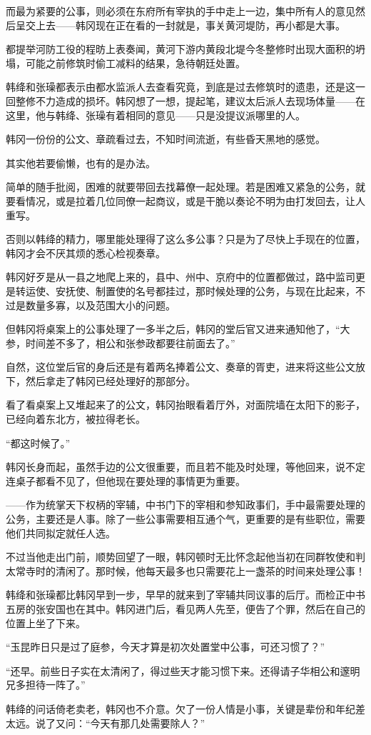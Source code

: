 而最为紧要的公事，则必须在东府所有宰执的手中走上一边，集中所有人的意见然后呈交上去——韩冈现在正在看的一封就是，事关黄河堤防，再小都是大事。

都提举河防工役的程昉上表奏闻，黄河下游内黄段北堤今冬整修时出现大面积的坍塌，可能之前修筑时偷工减料的结果，急待朝廷处置。

韩绛和张璪都表示由都水监派人去查看究竟，到底是过去修筑时的遗患，还是这一回整修不力造成的损坏。韩冈想了一想，提起笔，建议太后派人去现场体量——在这里，他与韩绛、张璪有着相同的意见——只是没提议派哪里的人。

韩冈一份份的公文、章疏看过去，不知时间流逝，有些昏天黑地的感觉。

其实他若要偷懒，也有的是办法。

简单的随手批阅，困难的就要带回去找幕僚一起处理。若是困难又紧急的公务，就要看情况，或是拉着几位同僚一起商议，或是干脆以奏论不明为由打发回去，让人重写。

否则以韩绛的精力，哪里能处理得了这么多公事？只是为了尽快上手现在的位置，韩冈才会不厌其烦的悉心检视奏章。

韩冈好歹是从一县之地爬上来的，县中、州中、京府中的位置都做过，路中监司更是转运使、安抚使、制置使的名号都挂过，那时候处理的公务，与现在比起来，不过是数量多寡，以及范围大小的问题。

但韩冈将桌案上的公事处理了一多半之后，韩冈的堂后官又进来通知他了，“大参，时间差不多了，相公和张参政都要往前面去了。”

自然，这位堂后官的身后还是有着两名捧着公文、奏章的胥吏，进来将这些公文放下，然后拿走了韩冈已经处理好的那部分。

看了看桌案上又堆起来了的公文，韩冈抬眼看着厅外，对面院墙在太阳下的影子，已经向着东北方，被拉得老长。

“都这时候了。”

韩冈长身而起，虽然手边的公文很重要，而且若不能及时处理，等他回来，说不定连桌子都看不见了，但他现在要处理的事情更为重要。

——作为统掌天下权柄的宰辅，中书门下的宰相和参知政事们，手中最需要处理的公务，主要还是人事。除了一些公事需要相互通个气，更重要的是有些职位，需要他们共同拟定就任人选。

不过当他走出门前，顺势回望了一眼，韩冈顿时无比怀念起他当初在同群牧使和判太常寺时的清闲了。那时候，他每天最多也只需要花上一盏茶的时间来处理公事！

韩绛和张璪都比韩冈早到一步，早早的就来到了宰辅共同议事的后厅。而检正中书五房的张安国也在其中。韩冈进门后，看见两人先至，便告了个罪，然后在自己的位置上坐了下来。

“玉昆昨日只是过了庭参，今天才算是初次处置堂中公事，可还习惯了？”

“还早。前些日子实在太清闲了，得过些天才能习惯下来。还得请子华相公和邃明兄多担待一阵了。”

韩绛的问话倚老卖老，韩冈也不介意。欠了一份人情是小事，关键是辈份和年纪差太远。说了又问：“今天有那几处需要除人？”

